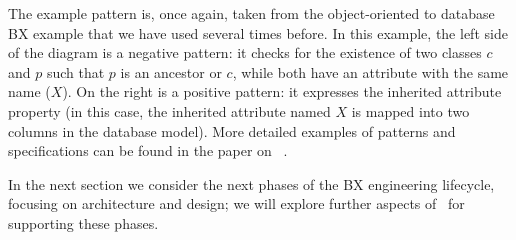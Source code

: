 The example pattern is, once again, taken from the object-oriented to database BX example that we have used several times before. In this example, the left side of the diagram is a negative pattern: it checks for the existence of two classes $c$ and $p$ such that $p$ is an ancestor or $c$, while both have an attribute with the same name ($X$). On the right is a positive pattern: it expresses the inherited attribute property (in this case, the inherited attribute named $X$ is mapped into two columns in the database model). More detailed examples of patterns and specifications can be found in the paper on \transml\ \cite{GuerraLKPS13}.

In the next section we consider the next phases of the BX engineering lifecycle, focusing on architecture and design; we will explore further aspects of \transml\ for supporting these phases.

